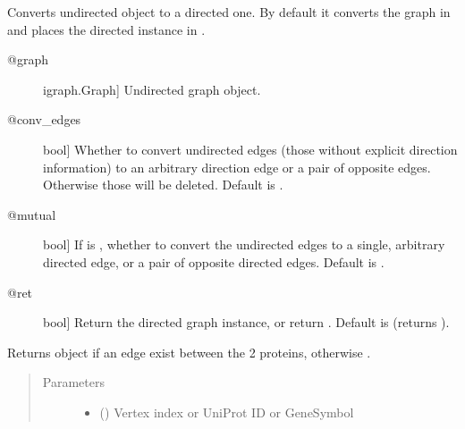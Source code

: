 \documentclass[letterpaper,10pt,english]{sphinxmanual}
\begin{document}
\begin{fulllineitems}
\begin{fulllineitems}
\end{fulllineitems}


\begin{fulllineitems}
\label{\detokenize{main:pypath.main.PyPath.get_directed}}
Converts  undirected  object to a directed one.
By default it converts the graph in  and places the directed
instance in .
\begin{description}
\item[{@graph}] \leavevmode{[}igraph.Graph{]}
Undirected graph object.

\item[{@conv\_edges}] \leavevmode{[}bool{]}
Whether to convert undirected edges (those without explicit
direction information) to an arbitrary direction edge or
a pair of opposite edges.
Otherwise those will be deleted. Default is .

\item[{@mutual}] \leavevmode{[}bool{]}
If  is , whether to convert the
undirected edges to a single, arbitrary directed edge,
or a pair of opposite directed edges. Default is .

\item[{@ret}] \leavevmode{[}bool{]}
Return the directed graph instance, or return .
Default is  (returns ).

\end{description}

\end{fulllineitems}


\begin{fulllineitems}
\label{\detokenize{main:pypath.main.PyPath.get_edge}}
Returns  object if an edge exist between
the 2 proteins, otherwise .
\begin{quote}\begin{description}
\item[{Parameters}] \leavevmode\begin{itemize}
\item {} 
 (\sphinxstyleliteralemphasis{\sphinxupquote{,}}) \textendash{} Vertex index or UniProt ID or GeneSymbol


\end{itemize}
\end{description}
\end{quote}
\end{fulllineitems}
\end{fulllineitems}
\end{document}
